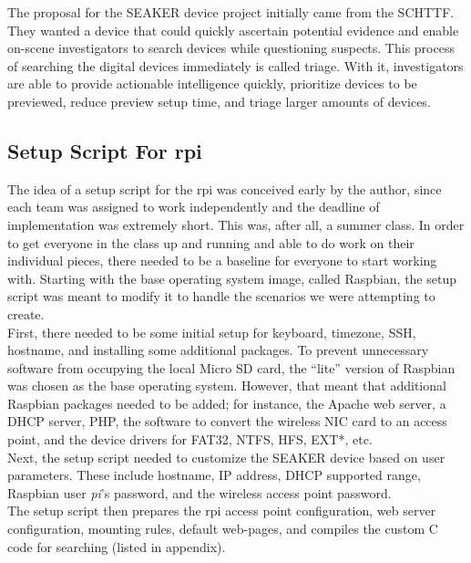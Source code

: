 \documentclass[12pt]{article}
\begin{document}
The proposal for the SEAKER device project initially came from the SCHTTF.  They wanted
a device that could quickly ascertain potential evidence and enable on-scene investigators
to search devices while questioning suspects.  This process of searching the digital devices
immediately is called triage.  With it, investigators are able to provide actionable
intelligence quickly, prioritize devices to be previewed, reduce preview setup time, and
triage larger amounts of devices.\\

\subsection{Setup Script For \gls{rpi}}

The idea of a setup script for the \gls{rpi} was conceived early by the author, since
each team was assigned to work independently and the deadline of implementation was
extremely short.  This was, after all, a summer class.  In order to get everyone in
the class up and running and able to do work on their individual pieces, there
needed to be a baseline for everyone to start working with.  Starting with the 
base operating system image, called Raspbian, the setup script was meant to modify
it to handle the scenarios we were attempting to create.\\

First, there needed to be some initial setup for keyboard, timezone, SSH, hostname,
and installing some additional packages.  To prevent unnecessary 
software from occupying the local Micro SD card, the ``lite'' version of Raspbian
was chosen as the base operating system.  However, that meant that additional
Raspbian packages needed to be added; for instance, the Apache web server, a DHCP
server, PHP, the software to convert the wireless NIC card to an access point, and
the device drivers for FAT32, NTFS, HFS, EXT*, etc.\\

Next, the setup script needed to customize the SEAKER device based on user
parameters.  These include hostname, IP address, DHCP supported range, Raspbian
user {\em pi}'s password, and the wireless access point password.\\

The setup script then prepares the \gls{rpi} access point configuration, web server
configuration, mounting rules, default web-pages, and compiles the custom C code
for searching (listed in appendix).\\
\end{document}
